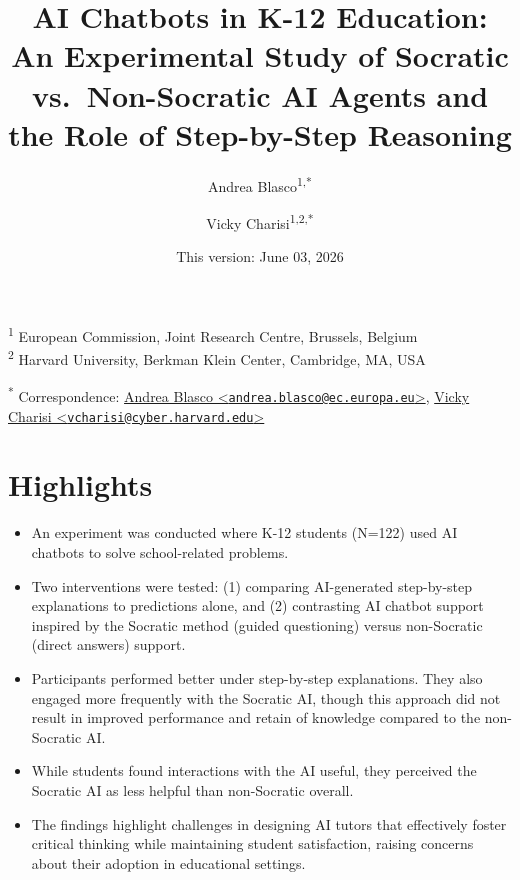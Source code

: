 \documentclass[
  11pt,
]{article}
\title{AI Chatbots in K-12 Education: An Experimental Study of Socratic vs.~Non-Socratic AI Agents and the Role of Step-by-Step Reasoning}
\author{Andrea Blasco\textsuperscript{1,*} \and Vicky Charisi\textsuperscript{1,2,*}}
\date{This version: June 03, 2026}
\begin{document}
\maketitle

\textsuperscript{1} European Commission, Joint Research Centre, Brussels, Belgium\\
\textsuperscript{2} Harvard University, Berkman Klein Center, Cambridge, MA, USA

\textsuperscript{*} Correspondence: \href{mailto:andrea.blasco@ec.europa.eu}{Andrea Blasco \textless{}\href{mailto:andrea.blasco@ec.europa.eu}{\nolinkurl{andrea.blasco@ec.europa.eu}}\textgreater{}}, \href{mailto:vcharisi@cyber.harvard.edu}{Vicky Charisi \textless{}\href{mailto:vcharisi@cyber.harvard.edu}{\nolinkurl{vcharisi@cyber.harvard.edu}}\textgreater{}}

\section*{Highlights}\label{highlights}

\begin{itemize}
\item
  An experiment was conducted where K-12 students (N=122) used AI chatbots to solve school-related problems.
\item
  Two interventions were tested: (1) comparing AI-generated step-by-step explanations to predictions alone, and (2) contrasting AI chatbot support inspired by the Socratic method (guided questioning) versus non-Socratic (direct answers) support.
\end{itemize}

\begin{itemize}
\item
  Participants performed better under step-by-step explanations. They also engaged more frequently with the Socratic AI, though this approach did not result in improved performance and retain of knowledge compared to the non-Socratic AI.
\item
  While students found interactions with the AI useful, they perceived the Socratic AI as less helpful than non-Socratic overall.
\item
  The findings highlight challenges in designing AI tutors that effectively foster critical thinking while maintaining student satisfaction, raising concerns about their adoption in educational settings.
\end{itemize}
\end{document}
